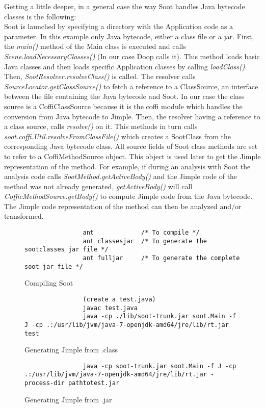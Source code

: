 \documentclass{dithesis}
\begin{document}
        Getting a little deeper, in a general case the way Soot handles Java bytecode classes is the following: \\
        Soot is launched by specifying a directory with the Application code as a parameter. In this example only Java bytecode, either a class file or a jar. First, the \textit{main()} method of the Main class is executed and calls \textit{Scene.loadNecessaryClasses()} (In our case Doop calls it). This method loads basic Java classes and then loads specific Application classes by calling \textit{loadClass()}. Then, \textit{SootResolver.resolveClass()} is called. The resolver calls \textit{SourceLocator.getClassSource()} to fetch a reference to a ClassSource, an interface between the file containing the Java bytecode and Soot. In our case the class source is a CoffiClassSource because it is the coffi module which handles the conversion from Java bytecode to Jimple. Then, the resolver having a reference to a class source, calls \textit{resolve()} on it. This methods in turn calls \textit{soot.coffi.Util.resolveFromClassFile()} which creates a SootClass from the corresponding Java bytecode class. All source fields of Soot class methods are set to refer to a CoffiMethodSource object. This object is used later to get the Jimple representation of the method. For example, if during an analysis with Soot the analysis code calls \textit{SootMethod.getActiveBody()} and the Jimple code of the method was not already generated, \textit{getActiveBody()} will call \textit{CofficMethodSource.getBody()} to compute Jimple code from the Java bytecode. The Jimple code representation of the method can then be analyzed and/or transformed.

        \begin{figure}[H]
            \begin{lstlisting}
                ant             /* To compile */
                ant classesjar  /* To generate the sootclasses jar file */
                ant fulljar     /* To generate the complete soot jar file */
            \end{lstlisting}
        \caption{Compiling Soot}
        \end{figure}
        \begin{figure}[H]
            \begin{lstlisting}
                (create a test.java)
                javac test.java
                java -cp ./lib/soot-trunk.jar soot.Main -f J -cp .:/usr/lib/jvm/java-7-openjdk-amd64/jre/lib/rt.jar test
            \end{lstlisting}
        \caption{Generating Jimple from .class}
        \end{figure}
        \begin{figure}[H]
            \begin{lstlisting}
                java -cp soot-trunk.jar soot.Main -f J -cp .:/usr/lib/jvm/java-7-openjdk-amd64/jre/lib/rt.jar -process-dir pathtotest.jar
            \end{lstlisting}
        \caption{Generating Jimple from .jar}
        \end{figure}
\end{document}
